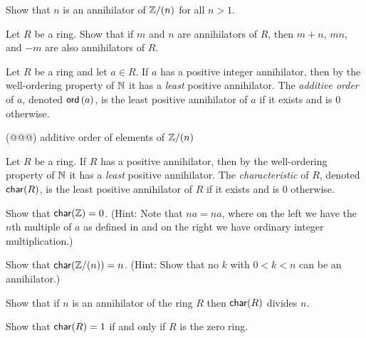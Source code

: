 \begin{exercise}
Show that \(n\) is an annihilator of \(\mathbb{Z}/(n)\) for all \(n > 1\).
\end{exercise}

\begin{exercise}
Let \(R\) be a ring.
Show that if \(m\) and \(n\) are annihilators of \(R\), then \(m+n\), \(mn\), and \(-m\) are also annihilators of \(R\).
\end{exercise}

\begin{dfn}
Let \(R\) be a ring and let \(a \in R\).
If \(a\) has a positive integer annihilator, then by the well-ordering property of \(\mathbb{N}\) it has a \emph{least} positive annihilator.
The \emph{additive order} of \(a\), denoted \(\mathsf{ord}\left(a\right)\), is the least positive annihilator of \(a\) if it exists and is \(0\) otherwise.
\end{dfn}

\begin{exercise}
(@@@) additive order of elements of \(\mathbb{Z}/(n)\)
\end{exercise}

\begin{dfn}[Characteristic] \label{dfn:characteristic}
Let \(R\) be a ring.
If \(R\) has a positive annihilator, then by the well-ordering property of \(\mathbb{N}\) it has a \emph{least} positive annihilator.
The \emph{characteristic}  of \(R\), denoted \(\mathsf{char}(R)\), is the least positive annihilator of \(R\) if it exists and is 0 otherwise.
\end{dfn}

\begin{exercise}
Show that \(\mathsf{char}(\mathbb{Z}) = 0\).
(Hint: Note that \(na = na\), where on the left we have the \(n\)th multiple of \(a\) as defined in  and on the right we have ordinary integer multiplication.)
\end{exercise}

\begin{exercise}
Show that \(\mathsf{char}(\mathbb{Z}/(n)) = n\).
(Hint: Show that no \(k\) with \(0 < k < n\) can be an annihilator.)
\end{exercise}

\begin{exercise}
Show that if \(n\) is an annihilator of the ring \(R\) then \(\mathsf{char}(R)\) divides \(n\).
\end{exercise}

\begin{exercise}
Show that \(\mathsf{char}(R) = 1\) if and only if \(R\) is the zero ring.
\end{exercise}

